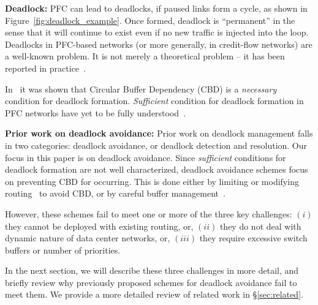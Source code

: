 {\bf Deadlock:} PFC can lead to deadlocks, if paused links form a cycle, as
shown in Figure~\ref{fig:deadlock_example}. Once formed, deadlock is
``permanent'' in the sense that it will continue to exist even if no new traffic
is injected into the loop. Deadlocks in PFC-based networks (or more generally,
in credit-flow networks) are a well-known problem. It is not merely a
theoretical problem -- it has been reported in practice~\cite{rdmaatscale}.

In~\cite{hu2016deadlocks} it was shown that Circular Buffer Dependency (CBD) is a
{\em necessary} condition for deadlock formation. {\em Sufficient} condition for
deadlock formation in PFC networks have yet to be fully
understood~\cite{hu2016deadlocks}. 

{\bf Prior work on deadlock avoidance:} Prior work on deadlock management falls
in two categories: deadlock avoidance, or deadlock detection and resolution. Our
focus in this paper is on deadlock avoidance.  Since {\em sufficient} conditions
for deadlock formation are not well characterized, deadlock avoidance schemes
focus on preventing CBD for occurring. This is done either by limiting or
modifying routing~\cite{tcpbolt} to avoid CBD, or by careful buffer
management~\cite{xxx}. 

However, these schemes fail to meet one or more of the three key challenges:
$(i)$ they cannot be deployed with existing routing, or, $(ii)$ they do not deal
with dynamic nature of data center networks, or, $(iii)$ they require excessive
switch buffers or number of priorities. 

In the next section, we will describe these three challenges in more detail, and
briefly review why previously proposed schemes for deadlock avoidance fail to
meet them. We provide a more detailed review of related work in
\S\ref{sec:related}.

